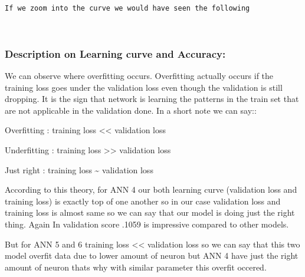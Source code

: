 \documentclass[11pt, a4paper , landscape]{article}
\begin{document}
    \begin{center}
    \end{center}
    { \hspace*{\fill} \\}
    
    \begin{Verbatim}[commandchars=\\\{\}]
If we zoom into the curve we would have seen the following

    \end{Verbatim}

    \begin{center}
    \end{center}
    { \hspace*{\fill} \\}
    
    \subsubsection{Description on Learning curve and
Accuracy:}\label{description-on-learning-curve-and-accuracy}

We can observe where overfitting occurs. Overfitting actually occurs if
the training loss goes under the validation loss even though the
validation is still dropping. It is the sign that network is learning
the patterns in the train set that are not applicable in the validation
done. In a short note we can say::

Overfitting : training loss \textless{}\textless{} validation loss

Underfitting : training loss \textgreater{}\textgreater{} validation
loss

Just right : training loss \textasciitilde{} validation loss

According to this theory, for ANN 4 our both learning curve (validation
loss and training loss) is exactly top of one another so in our case
validation loss and training loss is almost same so we can say that our
model is doing just the right thing. Again In validation score .1059 is
impressive compared to other models.

But for ANN 5 and 6 training loss \textless{}\textless{} validation loss
so we can say that this two model overfit data due to lower amount of
neuron but ANN 4 have just the right amount of neuron thats why with
similar parameter this overfit occered.
\end{document}
